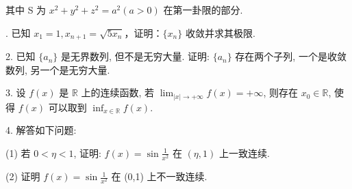 \documentclass{examcollection}
\begin{document}
{\begin{minipage}{\textwidth}
其中 S 为  $x^{2} + y^{2} + z^{2} = a^{2} (a > 0)$  在第一卦限的部分.\par
{}. 已知 $x_{1} = 1, x_{n + 1} = \sqrt{5x_{n}}$，证明：$\{x_{n}\}$ 收敛并求其极限.\par
2. 已知 $\{a_{n}\}$ 是无界数列, 但不是无穷大量. 证明: $\{a_{n}\}$ 存在两个子列, 一个是收敛数列, 另一个是无穷大量.\par
3. 设 $f(x)$ 是 $\mathbb{R}$ 上的连续函数, 若 $\lim_{|x|\to +\infty}f(x) = +\infty$, 则存在 $x_0 \in \mathbb{R}$, 使得 $f(x)$ 可以取到 $\inf_{x \in \mathbb{R}} f(x)$.\par
4. 解答如下问题:\par
(1) 若 $0 < \eta < 1$, 证明: $f(x) = \sin \frac{1}{x^2}$ 在 $(\eta, 1)$ 上一致连续.\par
(2) 证明 $f(x) = \sin \frac{1}{x^2}$ 在 (0,1) 上不一致连续.\par
\end{minipage}}
\ifdim\dimexpr\ht\proofbox+\dp\proofbox\relax>\textheight
\noindent\resizebox{!}{\textheight}{\usebox{\proofbox}}\else\noindent\usebox{\proofbox}\fi\clearpage
\end{document}
